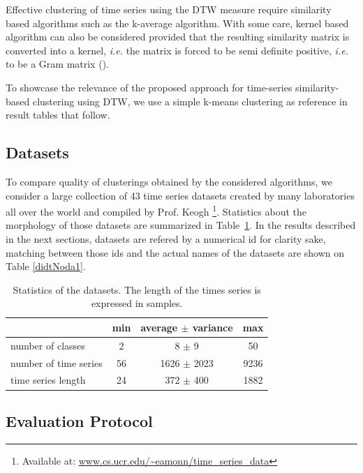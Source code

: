\documentclass[10pt,journal,compsoc]{IEEEtran}
\begin{document}
Effective clustering of time series using the DTW measure require similarity based algorithms such as the k-average algorithm. With some care, kernel based algorithm can also be considered provided that the resulting similarity matrix is converted into a kernel, \textit{i.e.} the matrix is forced to be semi definite positive, \textit{i.e.} to be a Gram matrix (\cite{Lanckriet:2004:LKM:1005332.1005334}).


To showcase the relevance of the proposed approach for time-series similarity-based clustering using DTW, we use a simple k-means clustering as reference in result tables that follow.

\subsection{Datasets}

To compare quality of clusterings obtained by the considered algorithms, we consider a large collection of 43 time series datasets created by many laboratories all over the world and compiled by Prof. Keogh \footnote{Available at: \url{www.cs.ucr.edu/~eamonn/time_series_data}}.  Statistics about the morphology of those datasets are summarized in Table~\ref{tab:dbs}. In the results described in the next sections, datasets are refered by a numerical id for clarity sake, matching between those ids and the actual names of the datasets are shown on Table \ref{didtNoda1}.

\begin{table}
\center
\caption{\label{tab:dbs} Statistics of the datasets. The length of the times series is expressed in samples.}
\begin{tabular}{l|ccc}
& min & average $\pm$ variance & max \\
\hline
number of classes & 2 & 8 $\pm$ 9 & 50 \\
number of time series & 56 & 1626 $\pm$ 2023 & 9236 \\
time series length & 24 & 372 $\pm$ 400 & 1882 \\
\end{tabular}
\end{table}

\subsection{Evaluation Protocol}
\end{document}

